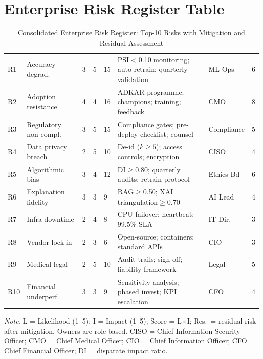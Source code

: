 \section*{Enterprise Risk Register Table}
\label{sec:app_ch5_tab_enterprise_risk_register_app}
\begin{table}[H]

\tablestripes
\tablefontsize
\caption[Enterprise Risk Register]{Consolidated Enterprise Risk Register: Top-10 Risks with Mitigation and Residual Assessment}
\begin{tabularx}{\textwidth}{@{} L L L L L L L L @{}}
\toprule
{} &  &  &  &  &  &  &  \\
\midrule
R1 & Accuracy degrad. & 3 & 5 & 15 & PSI$<$0.10 monitoring; auto-retrain; quarterly validation & ML Ops & 6 \\
\addlinespace
R2 & Adoption resistance & 4 & 4 & 16 & ADKAR programme; champions; training; feedback & CMO & 8 \\
\addlinespace
R3 & Regulatory non-compl. & 3 & 5 & 15 & Compliance gates; pre-deploy checklist; counsel & Compliance & 5 \\
\addlinespace
R4 & Data privacy breach & 2 & 5 & 10 & De-id ($k\geq5$); access controls; encryption & CISO & 4 \\
\addlinespace
R5 & Algorithmic bias & 3 & 4 & 12 & DI$\geq$0.80; quarterly audits; retrain protocol & Ethics Bd & 6 \\
\addlinespace
R6 & Explanation fidelity & 3 & 3 & 9 & RAG$\geq$0.50; XAI triangulation$\geq$0.70 & AI Lead & 4 \\
\addlinespace
R7 & Infra downtime & 2 & 4 & 8 & CPU failover; heartbeat; 99.5\% SLA & IT Dir. & 3 \\
\addlinespace
R8 & Vendor lock-in & 2 & 3 & 6 & Open-source; containers; standard APIs & CIO & 3 \\
\addlinespace
R9 & Medical-legal & 2 & 5 & 10 & Audit trails; sign-off; liability framework & Legal & 5 \\
\addlinespace
R10 & Financial underperf. & 3 & 3 & 9 & Sensitivity analysis; phased invest; KPI escalation & CFO & 4 \\
\bottomrule
\end{tabularx}
\vspace{0.5em}\noindent\textit{Note.} L = Likelihood (1--5); I = Impact (1--5); Score = L$\times$I; Res.\ = residual risk after mitigation. Owners are role-based. CISO = Chief Information Security Officer; CMO = Chief Medical Officer; CIO = Chief Information Officer; CFO = Chief Financial Officer; DI = disparate impact ratio.
\end{table}


